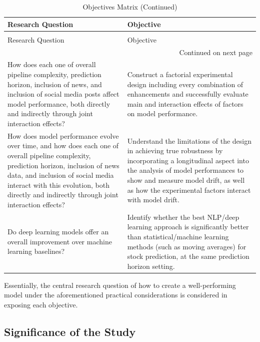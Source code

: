 \documentclass[stu,floatsintext]{apa7}
\begin{document}
\begin{longtable}{p{7cm}p{8cm}}
\caption{Objectives Matrix}
\label{tab:objectives} \\

\toprule
Research Question & Objective \\
\midrule
\endfirsthead

\caption[]{Objectives Matrix (Continued)} \\
\toprule
Research Question & Objective \\
\midrule
\endhead

\midrule
\multicolumn{2}{r}{Continued on next page} \\
\endfoot

\bottomrule
\endlastfoot

How does each one of overall pipeline complexity, prediction horizon, inclusion of news, and inclusion of social media posts affect model performance, both directly and indirectly through joint interaction effects?
&
Construct a factorial experimental design including every combination of enhancements and successfully evaluate main and interaction effects of factors on model performance.
\\

How does model performance evolve over time, and how does each one of overall pipeline complexity, prediction horizon, inclusion of news data, and inclusion of social media interact with this evolution, both directly and indirectly through joint interaction effects?
&
Understand the limitations of the design in achieving true robustness by incorporating a longitudinal aspect into the analysis of model performances to show and measure model drift, as well as how the experimental factors interact with model drift.
\\

Do deep learning models offer an overall improvement over machine learning baselines?
&
Identify whether the best NLP/deep learning approach is significantly better than statistical/machine learning methods (such as moving averages) for stock prediction, at the same prediction horizon setting.
\\
\end{longtable}

Essentially, the central research question of how to create a well-performing model under the aforementioned practical considerations is considered in exposing each objective.

\subsection{Significance of the Study}
\end{document}
